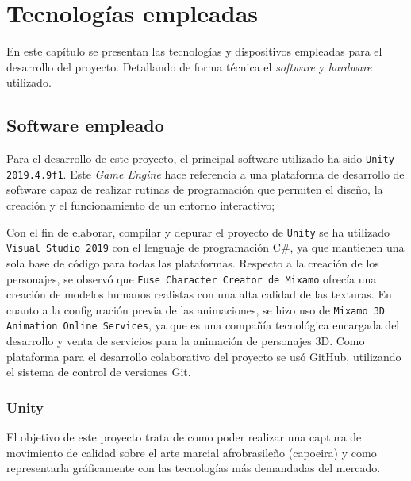 
%
%

\chapter{Tecnologías empleadas}
\label{cap4:sec:capitulo4}

En este capítulo se presentan las tecnologías y dispositivos empleadas para el desarrollo del proyecto. Detallando de forma técnica el \textit{software} y \textit{hardware} utilizado.

\section{Software empleado}

Para el desarrollo de este proyecto, el principal software utilizado ha sido \texttt{Unity 2019.4.9f1}\cite{Unity_Manual}. Este \textit{Game Engine} hace referencia a una plataforma de desarrollo de software capaz de realizar rutinas de programación que permiten el diseño, la creación y el funcionamiento de un entorno interactivo;

Con el fin de elaborar, compilar y depurar el proyecto de \texttt{Unity} se ha utilizado \texttt{Visual Studio 2019}\cite{ VisualStudio} con el lenguaje de programación C\#, ya que mantienen una sola base de código para todas las plataformas. Respecto a la creación de los personajes, se observó que \texttt{Fuse Character Creator de Mixamo}\cite{FuseCharCreaMixamo} ofrecía una  creación de modelos humanos realistas con una alta calidad de las texturas. En cuanto a la configuración previa de las animaciones, se hizo uso de \texttt{Mixamo 3D Animation Online Services}\cite{Mixamo3DAnimation}, ya que es una compañía tecnológica encargada del desarrollo y venta de servicios para la animación de personajes 3D. Como plataforma para el desarrollo colaborativo del proyecto se usó GitHub, utilizando el sistema de control de versiones Git.

\subsection{Unity}
\label{cap4:sec:unity}

El objetivo de este proyecto trata de como poder realizar una captura de movimiento de calidad sobre el arte marcial afrobrasileño (capoeira) y como representarla gráficamente con las tecnologías más demandadas del mercado.


